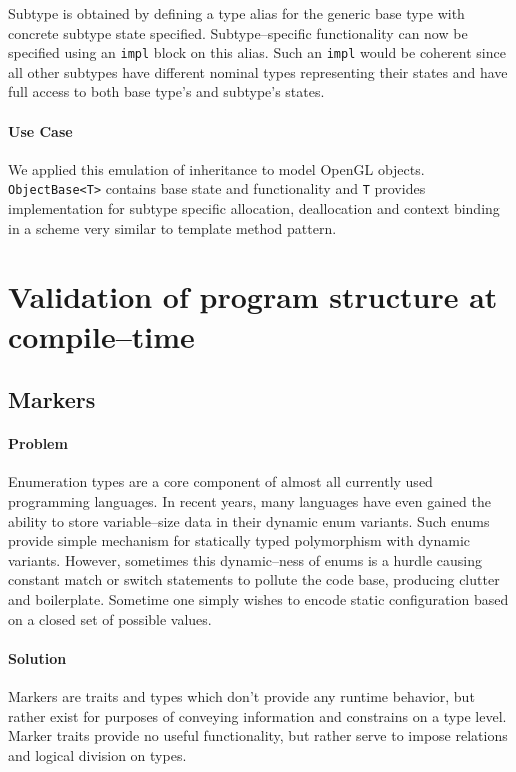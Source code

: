 Subtype is obtained by defining a type alias for the generic base type with concrete subtype state specified.
Subtype--specific functionality can now be specified using an \texttt{impl} block on this alias.
Such an \texttt{impl} would be coherent since all other subtypes have different nominal types representing their states and have full access to both base type's and subtype's states.

\paragraph{Use Case}

We applied this emulation of inheritance to model OpenGL objects. \texttt{ObjectBase<T>} contains base state and functionality and \texttt{T} provides implementation 
for subtype specific allocation, deallocation and context binding in a scheme very similar to template method pattern.

\section{Validation of program structure at compile--time}

\subsection{Markers}

\paragraph{Problem}

Enumeration types are a core component of almost all currently used programming languages. In recent years, many languages have even gained the ability to store variable--size data in their dynamic enum variants.
Such enums provide simple mechanism for statically typed polymorphism with dynamic variants. 
However, sometimes this dynamic--ness of enums is a hurdle causing constant match or switch statements to pollute the code base, producing clutter and boilerplate.
Sometime one simply wishes to encode static configuration based on a closed set of possible values.

\paragraph{Solution}

Markers are traits and types which don't provide any runtime behavior, but rather exist for purposes of conveying information and constrains on a type level.
Marker traits provide no useful functionality, but rather serve to impose relations and logical division on types.

